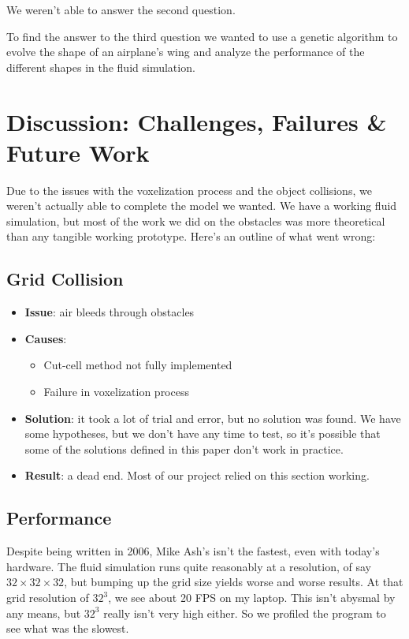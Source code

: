 \documentclass[a4paper,12pt,titlepage]{article}
\begin{document}
We weren't able to answer the second question. 

To find the answer to the third question we wanted to use a genetic algorithm to evolve the shape of an airplane's wing 
and analyze the performance of the different shapes in the fluid simulation. 

\pagebreak
\section{Discussion: Challenges, Failures \& Future Work}
Due to the issues with the voxelization process and the object collisions, we
weren't actually able to complete the model we wanted. We have a working fluid
simulation, but most of the work we did on the obstacles was more theoretical
than any tangible working prototype. Here's an outline of what went wrong:

\subsection{Grid Collision}
\begin{itemize}
	\item{\textbf{Issue}: air bleeds through obstacles}
	\item{\textbf{Causes}:}
		\begin{itemize}
			\item{Cut-cell method not fully implemented}
			\item{Failure in voxelization process}
		\end{itemize}
	\item{
			\textbf{Solution}: it took a lot of trial and error, but no solution
			was found. We have some hypotheses, but we don't have any time to test,
			so it's possible that some of the solutions defined in this paper don't
			work in practice.
		}
	\item{\textbf{Result}: a dead end. Most of our project relied on this section working.}
\end{itemize}

\subsection{Performance}
Despite being written in 2006, Mike Ash's isn't the fastest, even with today's
hardware. The fluid simulation runs quite reasonably at a resolution, of say
$32\times32\times32$, but bumping up the grid size yields worse and worse results.
At that grid resolution of $32^3$, we see about 20 FPS on my laptop. This isn't
abysmal by any means, but $32^3$ really isn't very high either. So we profiled
the program to see what was the slowest.
\end{document}
